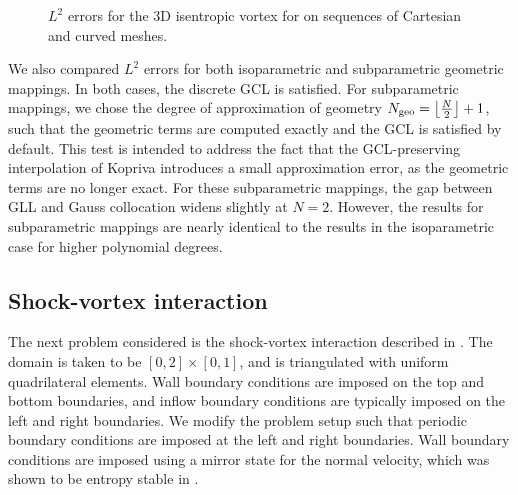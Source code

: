 \documentclass[review,onefignum,onetabnum,final]{siamart171218}
\newcommand{\note}[1]{{\color{blue}{#1}}}
\begin{document}
\begin{figure}
{
}
\caption{$L^2$ errors for the 3D isentropic vortex for \note{$N = 2,\ldots,5$} on sequences of Cartesian and curved meshes.}
\label{fig:err3d}
\end{figure}

We also compared $L^2$ errors for both isoparametric and subparametric geometric mappings.  In both cases, the discrete GCL is satisfied.  For subparametric mappings, we chose the degree of approximation of geometry $N_{\rm geo} = \left\lfloor\frac{N}{2} \right\rfloor + 1$, such that the geometric terms are computed exactly and the GCL is satisfied by default.   This test is intended to address the fact that the GCL-preserving interpolation of Kopriva introduces a small approximation error, as the geometric terms are no longer exact.  For these subparametric mappings, the gap between GLL and Gauss collocation widens slightly at $N=2$.  However, the results for subparametric mappings are nearly identical to the results in the isoparametric case for higher polynomial degrees.  


\subsection{Shock-vortex interaction}

The next problem considered is the shock-vortex interaction described in \cite{shu1998essentially}.  The domain is taken to be $[0,2]\times [0,1]$, and is triangulated with uniform quadrilateral elements.  Wall boundary conditions are imposed on the top and bottom boundaries, and inflow boundary conditions are typically imposed on the left and right boundaries.  We modify the problem setup such that periodic boundary conditions are imposed at the left and right boundaries.  Wall boundary conditions are imposed using a mirror state for the normal velocity, which was shown to be entropy stable in \cite{svard2014entropy, chen2017entropy}.  
\end{document}
